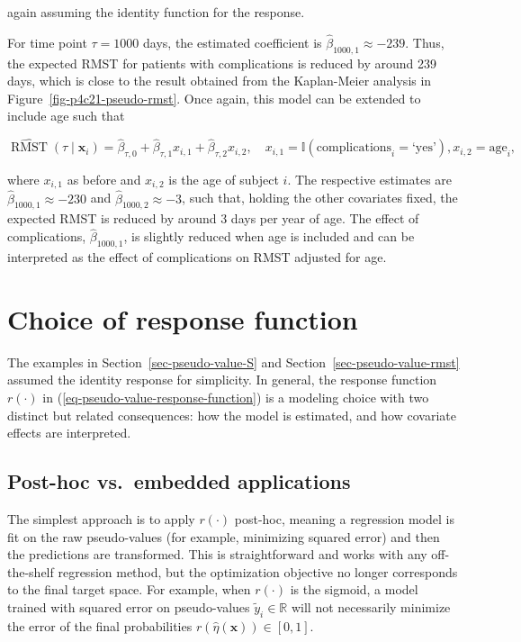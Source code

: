 \documentclass[
  letterpaper,
  krantz2]{style/krantz}
\begin{document}
again assuming the identity function for the response.

For time point \(\tau = 1000\) days, the estimated coefficient is
\(\hat{\beta}_{1000,1} \approx -239\). Thus, the expected RMST for
patients with complications is reduced by around 239 days, which is
close to the result obtained from the Kaplan-Meier analysis in
Figure~\ref{fig-p4c21-pseudo-rmst}. Once again, this model can be
extended to include age such that

\[
\widehat{\operatorname{RMST}}(\tau \mid \mathbf{x}_i) = \hat{\beta}_{\tau,0} + \hat{\beta}_{\tau,1} x_{i,1} + \hat{\beta}_{\tau,2} x_{i,2},\quad x_{i,1} = \mathbb{I}(\text{complications}_i = \text{`yes'}), x_{i,2} = \text{age}_i,
\]

where \(x_{i,1}\) as before and \(x_{i,2}\) is the age of subject \(i\).
The respective estimates are \(\hat{\beta}_{1000,1} \approx -230\) and
\(\hat{\beta}_{1000,2} \approx -3\), such that, holding the other
covariates fixed, the expected RMST is reduced by around 3 days per year
of age. The effect of complications, \(\hat{\beta}_{1000,1}\), is
slightly reduced when age is included and can be interpreted as the
effect of complications on RMST adjusted for age.

\section{Choice of response
function}\label{sec-pseudo-value-response-function}

The examples in Section~\ref{sec-pseudo-value-S} and
Section~\ref{sec-pseudo-value-rmst} assumed the identity response for
simplicity. In general, the response function
\(r(\cdot)\) in (\ref{eq-pseudo-value-response-function}) is a modeling
choice with two distinct but related consequences: how the model is
estimated, and how covariate effects are interpreted.

\subsection{Post-hoc vs.~embedded
applications}\label{post-hoc-vs.-embedded-applications}

The simplest approach is to apply \(r(\cdot)\) post-hoc, meaning a
regression model is fit on the raw pseudo-values (for example,
minimizing squared error) and then the predictions are transformed. This
is straightforward and works with any off-the-shelf regression method,
but the optimization objective no longer corresponds to the final target
space. For example, when \(r(\cdot)\) is the sigmoid, a model trained
with squared error on pseudo-values \(\tilde{y}_i \in \mathbb{R}\) will
not necessarily minimize the error of the final probabilities
\(r(\hat\eta(\mathbf{x})) \in [0,1]\).
\end{document}
